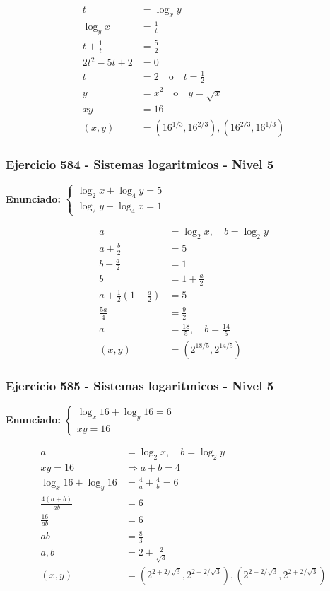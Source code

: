 \documentclass[12pt,a4paper]{article}
\begin{document}
\[
\begin{aligned}
t&=\log_xy\\
\log_yx&=\frac1t\\
t+\frac1t&=\frac52\\
2t^2-5t+2&=0\\
t&=2\quad \text{o}\quad t=\frac12\\
y&=x^2\quad \text{o}\quad y=\sqrt{x}\\
xy&=16\\
(x,y)&=\boxed{\left(16^{1/3},16^{2/3}\right),\left(16^{2/3},16^{1/3}\right)}
\end{aligned}
\]


\subsubsection*{Ejercicio 584 - Sistemas logaritmicos - Nivel 5}
\textbf{Enunciado:} \(\begin{cases}\log_2x+\log_4y=5\\ \log_2y-\log_4x=1\end{cases}\)

\[
\begin{aligned}
a&=\log_2x,
\quad b=\log_2y\\
a+\frac b2&=5\\
b-\frac a2&=1\\
b&=1+\frac a2\\
a+\frac12\left(1+\frac a2\right)&=5\\
\frac{5a}{4}&=\frac92\\
a&=\frac{18}{5},
\quad b=\frac{14}{5}\\
(x,y)&=\boxed{\left(2^{18/5},2^{14/5}\right)}
\end{aligned}
\]


\subsubsection*{Ejercicio 585 - Sistemas logaritmicos - Nivel 5}
\textbf{Enunciado:} \(\begin{cases}\log_x16+\log_y16=6\\ xy=16\end{cases}\)

\[
\begin{aligned}
a&=\log_2x,
\quad b=\log_2y\\
xy=16&\Rightarrow a+b=4\\
\log_x16+\log_y16&=\frac4a+\frac4b=6\\
\frac{4(a+b)}{ab}&=6\\
\frac{16}{ab}&=6\\
ab&=\frac83\\
a,b&=2\pm\frac{2}{\sqrt3}\\
(x,y)&=\boxed{\left(2^{2+2/\sqrt3},2^{2-2/\sqrt3}\right),\left(2^{2-2/\sqrt3},2^{2+2/\sqrt3}\right)}
\end{aligned}
\]
\end{document}
